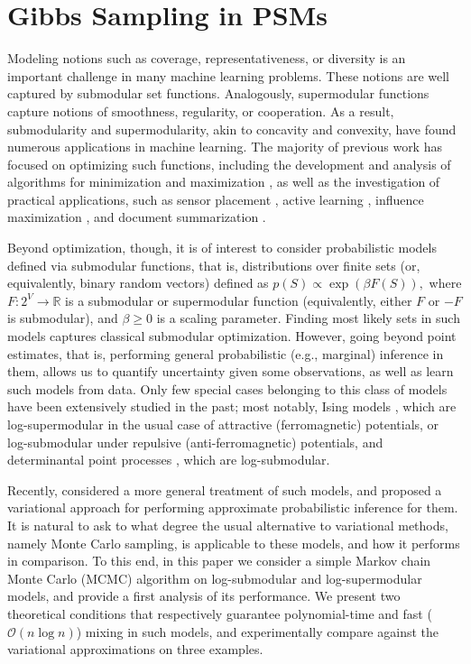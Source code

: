 \chapter{Gibbs Sampling in PSMs} \label{ch:gibbs}
Modeling notions such as coverage, representativeness, or diversity is an important challenge in many machine learning problems.
These notions are well captured by submodular set functions.
Analogously, supermodular functions capture notions of smoothness, regularity, or cooperation. 
As a result, submodularity and supermodularity, akin to concavity and convexity, have found numerous applications in machine learning.
The majority of previous work has focused on optimizing such functions, including the development and analysis of algorithms for minimization \cite{fujishige05} and maximization \cite{nemhauser78,feige07}, as well as the investigation of practical applications, such as sensor placement \cite{krause06}, active learning \cite{golovin11}, influence maximization \cite{kempe03}, and document summarization \cite{lin11}.

Beyond optimization, though, it is of interest to consider probabilistic models defined via submodular functions, that is, distributions over finite sets (or, equivalently, binary random vectors) defined as $p(S) \propto \exp(\beta F(S)),$ where $F : 2^V \to \mathbb{R}$ is a submodular or supermodular function (equivalently, either $F$ or $-F$ is submodular), and $\beta \geq 0$ is a scaling parameter.
Finding most likely sets in such models captures classical submodular optimization.
However, going beyond point estimates, that is, performing general probabilistic (e.g., marginal) inference in them, allows us to quantify uncertainty given some observations, as well as learn such models from data.
Only few special cases belonging to this class of models have been extensively studied in the past; most notably, Ising models \cite{koller09}, which are log-supermodular in the usual case of attractive (ferromagnetic) potentials, or log-submodular under repulsive (anti-ferromagnetic) potentials, and determinantal point processes \cite{kulesza12}, which are log-submodular.

Recently, \citet{djolonga14} considered a more general treatment of such models, and proposed a variational approach for performing approximate probabilistic inference for them.
It is natural to ask to what degree the usual alternative to variational methods, namely Monte Carlo sampling, is applicable to these models, and how it performs in comparison.
To this end, in this paper we consider a simple Markov chain Monte Carlo (MCMC) algorithm on log-submodular and log-supermodular models, and provide a first analysis of its performance.
We present two theoretical conditions that respectively guarantee polynomial-time and fast ($\mathcal{O}(n \log n)$) mixing in such models, and experimentally compare against the variational approximations on three examples.

